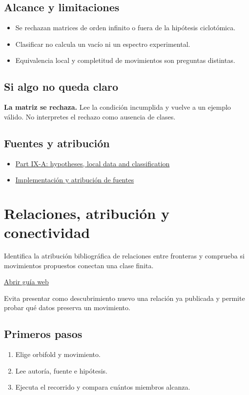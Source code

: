 \documentclass[11pt,a4paper]{article}
\begin{document}
\subsection*{Alcance y limitaciones}
\begin{itemize}
\item Se rechazan matrices de orden infinito o fuera de la hipótesis ciclotómica.
\item Clasificar no calcula un vacío ni un espectro experimental.
\item Equivalencia local y completitud de movimientos son preguntas distintas.
\end{itemize}
\subsection*{Si algo no queda claro}
\textbf{La matriz se rechaza.} Lee la condición incumplida y vuelve a un ejemplo válido. No interpretes el rechazo como ausencia de clases.

\subsection*{Fuentes y atribución}
\begin{itemize}
\item \href{https://karlesmarin.github.io/ghu-explorer/papers/part-ix-a/index.html}{Part IX-A: hypotheses, local data and classification}
\item \href{https://github.com/karlesmarin/ghu-lab/blob/main/src/sections/orbifold_section.js}{Implementación y atribución de fuentes}
\end{itemize}
\section{Relaciones, atribución y conectividad}
Identifica la atribución bibliográfica de relaciones entre fronteras y comprueba si movimientos propuestos conectan una clase finita.

\href{https://karlesmarin.github.io/ghu-explorer/guide/es/relations/index.html}{Abrir guía web}

Evita presentar como descubrimiento nuevo una relación ya publicada y permite probar qué datos preserva un movimiento.
\subsection*{Primeros pasos}
\begin{enumerate}
\item Elige orbifold y movimiento.
\item Lee autoría, fuente e hipótesis.
\item Ejecuta el recorrido y compara cuántos miembros alcanza.
\end{enumerate}
\end{document}
